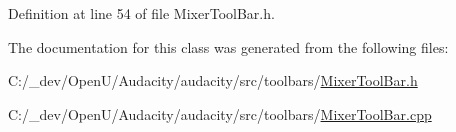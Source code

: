 Definition at line 54 of file Mixer\+Tool\+Bar.\+h.



The documentation for this class was generated from the following files\+:\begin{DoxyCompactItemize}
\item 
C\+:/\+\_\+dev/\+Open\+U/\+Audacity/audacity/src/toolbars/\hyperlink{_mixer_tool_bar_8h}{Mixer\+Tool\+Bar.\+h}\item 
C\+:/\+\_\+dev/\+Open\+U/\+Audacity/audacity/src/toolbars/\hyperlink{_mixer_tool_bar_8cpp}{Mixer\+Tool\+Bar.\+cpp}\end{DoxyCompactItemize}
